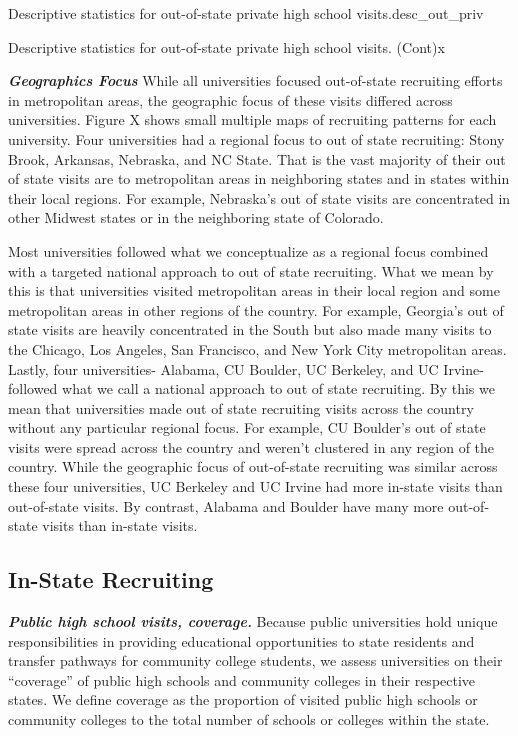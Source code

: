 \documentclass[twoside]{article}
\begin{document}
\begin{lscape-env}{Descriptive statistics for out-of-state private high school visits.}{desc_out_priv}
  
\end{lscape-env}

 \begin{lscape-env}{Descriptive statistics for out-of-state private high school visits. (Cont)}{x}
  
\end{lscape-env}

\textbf{\textit{Geographics Focus}} While all universities focused out-of-state recruiting efforts in metropolitan areas, the geographic focus of these visits differed across universities. Figure X shows small multiple maps of recruiting patterns for each university. Four universities had a regional focus to out of state recruiting: Stony Brook, Arkansas, Nebraska, and NC State. That is the vast majority of their out of state visits are to metropolitan areas in neighboring states and in states within their local regions. For example, Nebraska's out of state visits are concentrated in other Midwest states or in the neighboring state of Colorado. 

Most universities followed what we conceptualize as a regional focus combined with a targeted national approach to out of state recruiting. What we mean by this is that universities visited metropolitan areas in their local region and some metropolitan areas in other regions of the country. For example, Georgia's out of state visits are heavily concentrated in the South but also made many visits to the Chicago, Los Angeles, San Francisco, and New York City metropolitan areas. Lastly, four universities- Alabama, CU Boulder, UC Berkeley, and UC Irvine- followed what we call a national approach to out of state recruiting. By this we mean that universities made out of state recruiting visits across the country without any particular regional focus. For example, CU Boulder's out of state visits were spread across the country and weren't clustered in any region of the country.  While the geographic focus of out-of-state recruiting was similar across these four universities, UC Berkeley and UC Irvine had more in-state visits than out-of-state visits. By contrast, Alabama and Boulder have many more out-of-state visits than in-state visits. 

\subsection*{In-State Recruiting}
\textbf{\textit{Public high school visits, coverage.}} Because public universities hold unique responsibilities in providing educational opportunities to state residents and transfer pathways for community college students, we assess universities on their “coverage” of public high schools and community colleges in their respective states. We define coverage as the proportion of visited public high schools or community colleges to the total number of schools or colleges within the state.
\end{document}
